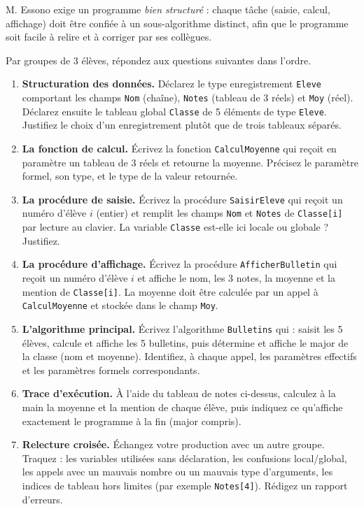 \documentclass[11pt]{article}
\newcounter{popsec}
\newcounter{popsub}
\newcommand{\courssub}[1]{%
  \stepcounter{popsub}%
  \par\vspace{9pt}\noindent{\popxbold\fontsize{11.5}{13}\selectfont\color{popink}{\color{poporange}\thepopsec.\thepopsub}\hspace{6pt}#1}\par\nopagebreak\vspace{4pt}
}
\begin{document}
M. Essono exige un programme \emph{bien structuré} : chaque tâche (saisie, calcul, affichage) doit être confiée à un sous-algorithme distinct, afin que le programme soit facile à relire et à corriger par ses collègues.

\courssub{Consignes}

Par groupes de 3 élèves, répondez aux questions suivantes dans l'ordre.

\begin{enumerate}
  \item \textbf{Structuration des données.} Déclarez le type enregistrement \texttt{Eleve} comportant les champs \texttt{Nom} (chaîne), \texttt{Notes} (tableau de 3 réels) et \texttt{Moy} (réel). Déclarez ensuite le tableau global \texttt{Classe} de 5 éléments de type \texttt{Eleve}. Justifiez le choix d'un enregistrement plutôt que de trois tableaux séparés.
  \item \textbf{La fonction de calcul.} Écrivez la fonction \texttt{CalculMoyenne} qui reçoit en paramètre un tableau de 3 réels et retourne la moyenne. Précisez le paramètre formel, son type, et le type de la valeur retournée.
  \item \textbf{La procédure de saisie.} Écrivez la procédure \texttt{SaisirEleve} qui reçoit un numéro d'élève $i$ (entier) et remplit les champs \texttt{Nom} et \texttt{Notes} de \texttt{Classe[i]} par lecture au clavier. La variable \texttt{Classe} est-elle ici locale ou globale ? Justifiez.
  \item \textbf{La procédure d'affichage.} Écrivez la procédure \texttt{AfficherBulletin} qui reçoit un numéro d'élève $i$ et affiche le nom, les 3 notes, la moyenne et la mention de \texttt{Classe[i]}. La moyenne doit être calculée par un appel à \texttt{CalculMoyenne} et stockée dans le champ \texttt{Moy}.
  \item \textbf{L'algorithme principal.} Écrivez l'algorithme \texttt{Bulletins} qui : saisit les 5 élèves, calcule et affiche les 5 bulletins, puis détermine et affiche le major de la classe (nom et moyenne). Identifiez, à chaque appel, les paramètres effectifs et les paramètres formels correspondants.
  \item \textbf{Trace d'exécution.} À l'aide du tableau de notes ci-dessus, calculez à la main la moyenne et la mention de chaque élève, puis indiquez ce qu'affiche exactement le programme à la fin (major compris).
  \item \textbf{Relecture croisée.} Échangez votre production avec un autre groupe. Traquez : les variables utilisées sans déclaration, les confusions local/global, les appels avec un mauvais nombre ou un mauvais type d'arguments, les indices de tableau hors limites (par exemple \texttt{Notes[4]}). Rédigez un rapport d'erreurs.
\end{enumerate}
\end{document}
